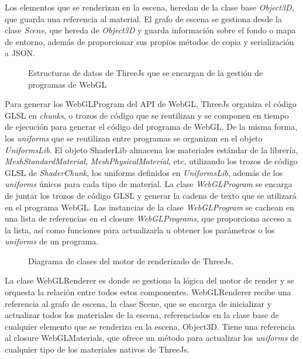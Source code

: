 Los elementos que se renderizan en la escena, heredan de la clase base \textit{Object3D}, que guarda una referencia
al material. El grafo de escena se gestiona desde la clase \textit{Scene}, que hereda de \textit{Object3D} y guarda
informaci\'on sobre el fondo o mapa de entorno, adem\'as de proporcionar sus propios m\'etodos de copia y serializaci\'on
a JSON.

\begin{figure}[H]
  \vspace{0.5cm}
  \centering
  \caption{Estructuras de datos de ThreeJs que se encargan de la gesti\'on de programas de WebGL}
\end{figure}

Para generar los WebGLProgram del API de WebGL, ThreeJs organiza el c\'odigo GLSL en \textit{chunks}, o trozos de c\'odigo
que se reutilizan y se componen en tiempo de ejecuci\'on para generar el c\'odigo del programa de WebGL. De la misma forma, los
\textit{uniforms} que se reutilizan entre programas se organizan en el objeto \textit{UniformsLib}. El objeto ShaderLib almacena
los materiales est\'andar de la librer\'ia, \textit{MeshStandardMaterial}, \textit{MeshPhysicalMaterial}, etc, utilizando los trozos
de c\'odigo GLSL de \textit{ShaderChunk}, los uniforms definidos en \textit{UniformsLib}, adem\'as de los \textit{uniforms} \'unicos
para cada tipo de material.
La clase \textit{WebGLProgram} se encarga de juntar los trozos de c\'odigo GLSL y generar la cadena de texto que se utilizar\'a en
el programa WebGL. Las instancias de la clase \textit{WebGLProgram} se cachean en una lista de referencias en el closure \textit{WebGLPrograms}, que proporciona
acceso a la lista, as\'i como funciones para actualizarla u obtener los par\'ametros o los \textit{uniforms} de un programa. \\


\begin{figure}[H]
  \vspace{0.5cm}
  \centering
  \caption{Diagrama de clases del motor de renderizado de ThreeJs.}
  \vspace{0.5cm}
\end{figure}

La clase WebGLRenderer es donde se gestiona la l\'ogica del motor de render y se orquesta la relaci\'on entre todos estos componentes.
WebGLRenderer recibe una referencia al grafo de escena, la clase Scene, que se encarga de inicializar y actualizar todos
los materiales de la escena, referenciados en la clase base de cualquier elemento que se renderiza en la escena, Object3D.
Tiene una referencia al closure WebGLMaterials, que ofrece un m\'etodo para actualizar los \textit{uniforms} de cualquier tipo
de los materiales nativos de ThreeJs.

